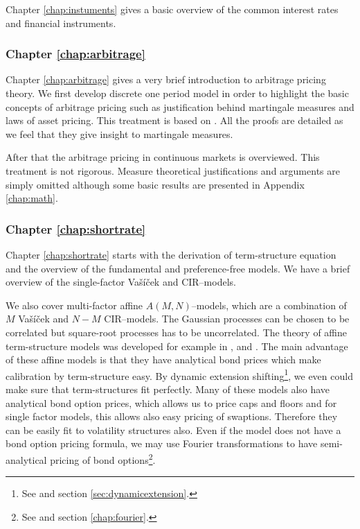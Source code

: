 Chapter \ref{chap:instuments} gives a basic overview of the common interest rates and financial instruments. 

\subsubsection*{Chapter \ref{chap:arbitrage}}

Chapter \ref{chap:arbitrage} gives a very brief introduction to arbitrage pricing theory. We first develop discrete one period model in order to highlight the basic concepts of arbitrage pricing such as justification behind martingale measures and laws of asset pricing. This treatment is based on \textcite[pp. 5--34]{bjork2004arbitrage}. All the proofs are detailed as we feel that they give insight to martingale measures.  

After that the arbitrage pricing in continuous markets is overviewed. This treatment is not rigorous. Measure theoretical justifications and arguments are simply omitted although some basic results are  presented in Appendix \ref{chap:math}.

\subsubsection*{Chapter \ref{chap:shortrate}}

Chapter \ref{chap:shortrate} starts with the derivation of term-structure equation and the overview of the fundamental and preference-free models. We have a brief overview of the single-factor Va\v{s}\'{i}\v{c}ek and CIR--models. 

We also cover multi-factor affine $A(M,N)$--models, which are a combination of $M$ Va\v{s}\'{i}\v{c}ek and $N-M$ CIR--models. The Gaussian processes can be chosen to be correlated but square-root processes has to be uncorrelated. The theory of affine term-structure models was developed for example in \textcite{brown1994interest}, \textcite{duffie1994multi} and \textcite{duffiekan1996yield}. The main advantage of these affine models is that they have analytical bond prices which make calibration by term-structure easy. By dynamic extension shifting\footnote{See \textcite{brigomercurio2001deterministic} and section \ref{sec:dynamicextension}.}, we even could make sure that term-structures fit perfectly.
Many of these models also have analytical bond option prices, which allows us to price caps and floors and for single factor models, this allows also easy pricing of swaptions. Therefore they can be easily fit to volatility structures also. Even if the model does not have a bond option pricing formula, we may use Fourier transformations to have semi-analytical pricing of bond options\footnote{See \textcite{heston1993closed} and section \ref{chap:fourier}.}.

